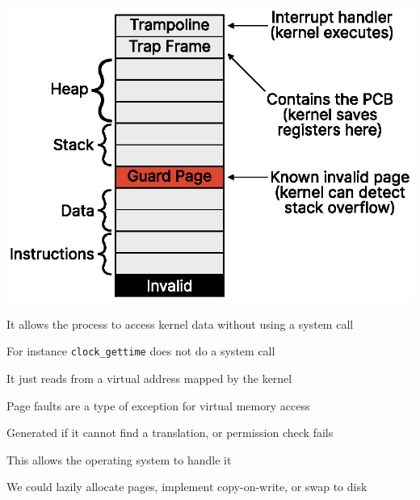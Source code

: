   \begin{slide}


    \centering
    \includegraphics{address-space.eps}

  \end{slide}

  \begin{slide}


    It allows the process to access kernel data without using
    a system call
    \medskip

    For instance \texttt{clock\_gettime} does not do a system call

    \leftspace{}It just reads from a virtual address mapped by the kernel

  \end{slide}

  \begin{slide}


    Page faults are a type of exception for virtual memory access

    \leftspace{}Generated if it cannot find a translation, or permission check fails
    \medskip

    This allows the operating system to handle it

    \leftspace{}We could lazily allocate pages, implement copy-on-write, or swap to disk

  \end{slide}

